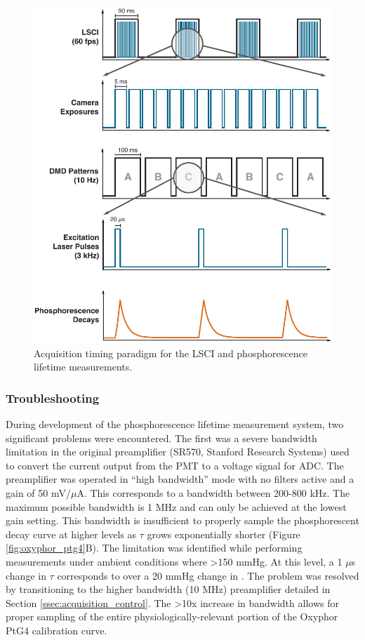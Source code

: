 \begin{figure}
    \includegraphics{figures/chapter_2/timingschematic.pdf}
    \caption {
        \label{fig:timingschematic}
        Acquisition timing paradigm for the LSCI and phosphorescence lifetime measurements.
    }
\end{figure}

\subsubsection{Troubleshooting}

During development of the phosphorescence lifetime measurement system, two significant problems were encountered. The first was a severe bandwidth limitation in the original preamplifier (SR570, Stanford Research Systems) used to convert the current output from the PMT to a voltage signal for ADC. The preamplifier was operated in “high bandwidth” mode with no filters active and a gain of 50 mV/$\mu$A. This corresponds to a bandwidth between 200-800 kHz. The maximum possible bandwidth is 1 MHz and can only be achieved at the lowest gain setting. This bandwidth is insufficient to properly sample the phosphorescent decay curve at higher  levels as $\tau$ grows exponentially shorter (Figure \ref{fig:oxyphor_ptg4}B). The limitation was identified while performing measurements under ambient conditions where  \textgreater 150 mmHg. At this  level, a 1 $\mu$s change in $\tau$ corresponds to over a 20 mmHg change in . The problem was resolved by transitioning to the higher bandwidth (10 MHz) preamplifier detailed in Section \ref{ssec:acquisition_control}. The \textgreater 10x increase in bandwidth allows for proper sampling of the entire physiologically-relevant portion of the Oxyphor PtG4 calibration curve.

